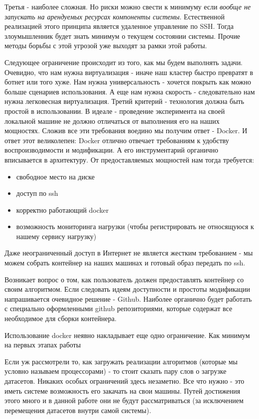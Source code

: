 Третья - наиболее сложная. Но риски можно свести к минимуму если \textit{вообще не запускать на арендуемых ресурсах компоненты системы}. Естественной реализацией этого принципа является удаленное управление по SSH. Тогда злоумышленник будет знать минимум о текущем состоянии системы. Прочие методы борьбы с этой угрозой уже выходят за рамки этой работы.

Следующее ограничение происходит из того, как мы будем выполнять задачи. Очевидно, что нам нужна виртуализация - иначе наш кластер быстро превратят в ботнет или того хуже. Нам нужна универсальность - хочется покрыть как можно больше сценариев использования. А еще нам нужна скорость - следовательно нам нужна легковесная виртуализация. Третий критерий - технология должна быть простой в использовании. В идеале - проведение эксперимента на своей локальной машине не должно отличаться от выполнения его на наших мощностях. Сложив все эти требования воедино мы получим ответ - Docker. И ответ этот великолепен: Docker отлично отвечает требованиям к удобству воспроизводимости и модификации. А его инструментарий органично вписывается в архитектуру. От предоставляемых мощностей нам тогда требуется:

\begin{itemize}
	\item свободное место на диске
	\item доступ по ssh
	\item корректно работающий docker
	\item возможность мониторинга нагрузки (чтобы регистрировать не относящуюся к нашему сервису нагрузку)
\end{itemize}

Даже неограниченный доступ в Интернет не является жестким требованием - мы можем собрать контейнер на наших машинах и готовый образ передать по ssh.

Возникает вопрос о том, как пользователь должен предоставлять контейнер со своим алгоритмом. Если следовать идеям доступности и простоты модификации напрашивается очевидное решение - Github. Наиболее органично будет работать с специально оформленными github репозиториями, которые содержат все необходимое для сборки контейнера.

Использование docker неявно накладывает еще одно ограничение. Как минимум на первых этапах работы

Если уж рассмотрели то, как загружать реализации алгоритмов (которые мы условно называем процессорами) - то стоит сказать пару слов о загрузке датасетов. Никаких особых ограничений здесь незаметно. Все что нужно - это иметь системе возможность его закачать на свои машины. Путей достижения этого много и в данной работе они не будут рассматриваться (за исключением перемещения датасетов внутри самой системы).

